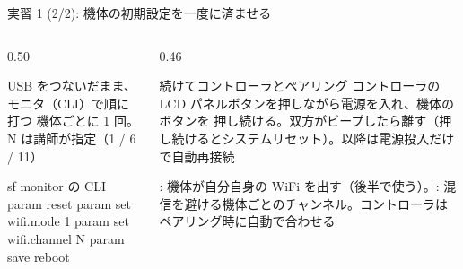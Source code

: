 \begin{frame}[fragile]{実習 1 (2/2): 機体の初期設定を一度に済ませる}
  \vspace{0.2em}
  \begin{columns}[T]
    \begin{column}{0.50\textwidth}
      \begin{block}{USB をつないだまま、モニタ（CLI）で順に打つ}
        \footnotesize 機体ごとに 1 回。N は講師が指定（1 / 6 / 11）
        \begin{sflisting}[basicstyle=\ttfamily\scriptsize]{sf monitor の CLI}
param reset
param set wifi.mode 1
param set wifi.channel N
param save
reboot
        \end{sflisting}
      \end{block}
    \end{column}
    \begin{column}{0.46\textwidth}
      \begin{exampleblock}{続けてコントローラとペアリング}
        \footnotesize コントローラの LCD パネルボタンを押しながら電源を入れ、機体のボタンを 押し続ける。双方がビープしたら離す（押し続けるとシステムリセット）。以降は電源投入だけで自動再接続
      \end{exampleblock}
      {\footnotesize {}: 機体が自分自身の WiFi を出す（後半で使う）。: 混信を避ける機体ごとのチャンネル。コントローラはペアリング時に自動で合わせる}
    \end{column}
  \end{columns}
\end{frame}

